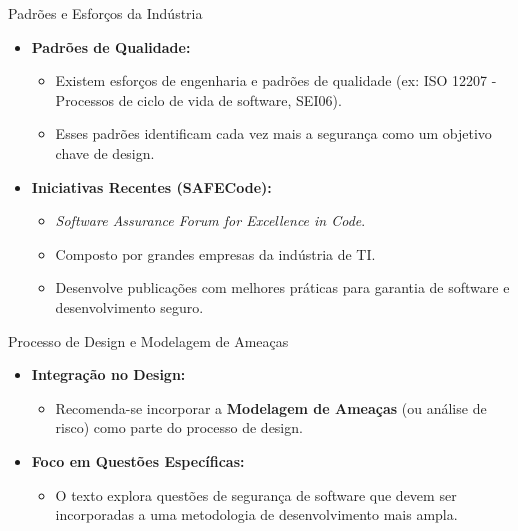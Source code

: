 \begin{frame}{Padrões e Esforços da Indústria}
    \begin{itemize}
        \item \textbf{Padrões de Qualidade:}
              \begin{itemize}
                  \item Existem esforços de engenharia e padrões de qualidade (ex: ISO 12207 - Processos de ciclo de vida de software, SEI06).
                  \item Esses padrões identificam cada vez mais a segurança como um objetivo chave de design.
              \end{itemize}

        \item \textbf{Iniciativas Recentes (SAFECode):}
              \begin{itemize}
                  \item \textit{Software Assurance Forum for Excellence in Code}.
                  \item Composto por grandes empresas da indústria de TI.
                  \item Desenvolve publicações com melhores práticas para garantia de software e desenvolvimento seguro.
              \end{itemize}
    \end{itemize}
\end{frame}

\begin{frame}{Processo de Design e Modelagem de Ameaças}
    \begin{itemize}
        \item \textbf{Integração no Design:}
              \begin{itemize}
                  \item Recomenda-se incorporar a \textbf{Modelagem de Ameaças} (ou análise de risco) como parte do processo de design.
              \end{itemize}

        \item \textbf{Foco em Questões Específicas:}
              \begin{itemize}
                  \item O texto explora questões de segurança de software que devem ser incorporadas a uma metodologia de desenvolvimento mais ampla.
              \end{itemize}
    \end{itemize}
\end{frame}

